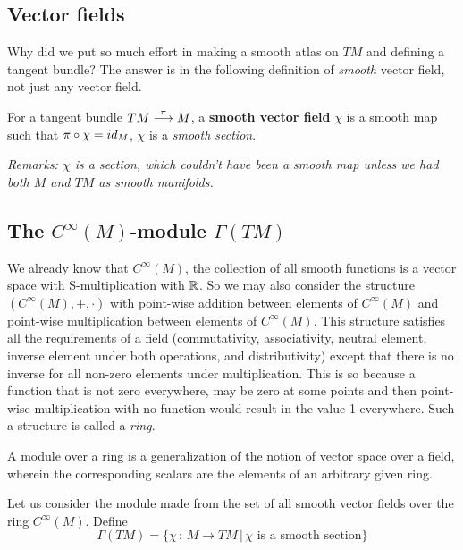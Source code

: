 \subsection{Vector fields}
Why did we put so much effort in making a smooth atlas on $TM$ and defining a tangent bundle? The answer is in the following definition of \emph{smooth} vector field, not just any vector field.

\begin{definition}
For a tangent bundle $TM \stackrel{\pi}{\longrightarrow} M$, a \textbf{smooth vector field} $\chi$ is a smooth map such that $\pi \circ \chi = id_{M}$, $\chi$ is a \textit{smooth section}.
\end{definition}


\textit{Remarks: $\chi$ is a section, which couldn't have been a smooth map unless we had both $M$ and $TM$ as smooth manifolds.}

\subsection{The $C^{\infty}(M)$-module $\Gamma(TM)$}
We already know that $C^{\infty}(M)$, the collection of all smooth functions is a vector space with S-multiplication with $\mathbb{R}$. So we may also consider the structure $(C^{\infty}(M),+,\cdot)$ with point-wise addition between elements of $C^{\infty}(M)$ and point-wise multiplication between elements of $C^{\infty}(M)$. This structure satisfies all the requirements of a field (commutativity, associativity, neutral element, inverse element under both operations, and distributivity) except that there is no inverse for all non-zero elements under multiplication. This is so because a function that is not zero everywhere, may be zero at some points and then point-wise multiplication with no function would result in the value 1 everywhere. Such a structure is called a \textit{ring}. 

A module over a ring is a generalization of the notion of vector space over a field, wherein the corresponding scalars are the elements of an arbitrary given ring.

Let us consider the module made from the set of all smooth vector fields over the ring $C^{\infty}(M)$. Define \\
\begin{equation}
\Gamma(TM) = \lbrace \chi \, : \, M \to TM \, | \, \chi \text{ is a smooth section} \rbrace
\end{equation}

